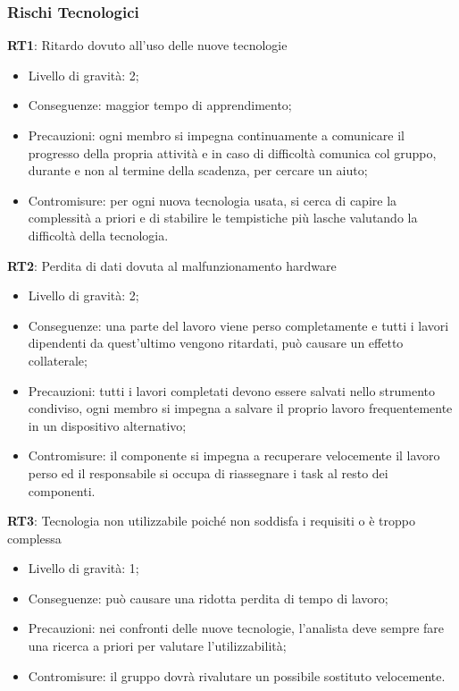 \subsubsection{Rischi Tecnologici}
\textbf{RT1}:
 Ritardo dovuto all'uso delle nuove tecnologie
\begin{itemize}
\item Livello di gravità: 2;
\item Conseguenze: maggior tempo di apprendimento;
\item Precauzioni: ogni membro si impegna continuamente a comunicare il progresso della propria attività e in caso di difficoltà comunica col gruppo, durante e non al termine della scadenza, per cercare un aiuto;
\item Contromisure: per ogni nuova tecnologia usata, si cerca di capire la complessità a priori e di stabilire le tempistiche più lasche valutando la difficoltà della tecnologia.
\end{itemize}
\textbf{RT2}: 
Perdita di dati dovuta al malfunzionamento hardware
\begin{itemize}
\item Livello di gravità: 2;
\item Conseguenze: una parte del lavoro viene perso completamente e tutti i lavori dipendenti da quest'ultimo vengono ritardati, può causare un effetto collaterale;
\item Precauzioni: tutti i lavori completati devono essere salvati nello strumento condiviso, ogni membro si impegna a salvare il proprio lavoro frequentemente in un dispositivo alternativo;
\item Contromisure: il componente si impegna a recuperare velocemente il lavoro perso ed il responsabile si occupa di riassegnare i task al resto dei componenti.
\end{itemize}
\textbf{RT3}: 
Tecnologia non utilizzabile poiché non soddisfa i requisiti o è troppo complessa
\begin{itemize}
\item Livello di gravità: 1;
\item Conseguenze: può causare una ridotta perdita di tempo di lavoro;
\item Precauzioni: nei confronti delle nuove tecnologie, l'analista deve sempre fare una ricerca a priori per valutare l'utilizzabilità;
\item Contromisure: il gruppo dovrà rivalutare un possibile sostituto velocemente.
\end{itemize}

